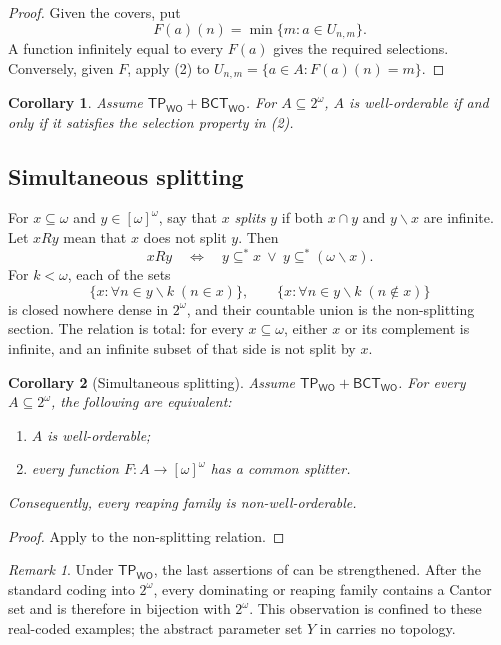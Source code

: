\documentclass[11pt,reqno]{amsart}
\newcommand{\WO}{\mathsf{WO}}
\newcommand{\BCTWO}{\mathsf{BCT}_{\WO}}
\newcommand{\TP}{\mathsf{TP}_{\WO}}
\theoremstyle{plain}
\newtheorem{corollary}[corollary]{Corollary}
\theoremstyle{definition}
\theoremstyle{remark}
\newtheorem{remark}[remark]{Remark}
\begin{document}
\begin{proof}
Given the covers, put
\[
 F(a)(n)=\min\{m:a\in U_{n,m}\}.
\]
A function infinitely equal to every $F(a)$ gives the required selections.
Conversely, given $F$, apply (2) to
$U_{n,m}=\{a\in A:F(a)(n)=m\}$.
\end{proof}

\begin{corollary}\label{cor:cover-selection}
Assume $\TP+\BCTWO$.  For $A\subseteq2^\omega$, $A$ is well-orderable if
and only if it satisfies the selection property in
(2).
\end{corollary}

\subsection{Simultaneous splitting}

For $x\subseteq\omega$ and $y\in[\omega]^\omega$, say that $x$ \emph{splits}
$y$ if both $x\cap y$ and $y\smallsetminus x$ are infinite.  Let $xRy$ mean that
$x$ does not split $y$.  Then
\[
 xRy\quad\Longleftrightarrow\quad
 y\subseteq^*x\ \lor\ y\subseteq^*(\omega\smallsetminus x).
\]
For $k<\omega$, each of the sets
\[
 \{x:\forall n\in y\smallsetminus k\;(n\in x)\},
 \qquad
 \{x:\forall n\in y\smallsetminus k\;(n\notin x)\}
\]
is closed nowhere dense in $2^\omega$, and their countable union is the
non-splitting section.  The relation is total: for every $x\subseteq\omega$,
either $x$ or its complement is infinite, and an infinite subset of that side
is not split by $x$.

\begin{corollary}[Simultaneous splitting]\label{cor:splitting}
Assume $\TP+\BCTWO$.  For every $A\subseteq2^\omega$, the following are
equivalent:
\begin{enumerate}
\item $A$ is well-orderable;
\item every function $F:A\to[\omega]^\omega$ has a common splitter.
\end{enumerate}
Consequently, every reaping family is non-well-orderable.
\end{corollary}

\begin{proof}
Apply  to the non-splitting relation.
\end{proof}

\begin{remark}\label{rem:perfect-witnesses}
Under $\TP$, the last assertions of 
can be strengthened.  After the standard coding into $2^\omega$, every dominating or reaping family contains a Cantor set and is therefore in bijection with $2^\omega$.  This observation is confined to these real-coded examples; the abstract parameter set $Y$ in  carries no topology.
\end{remark}
\end{document}
